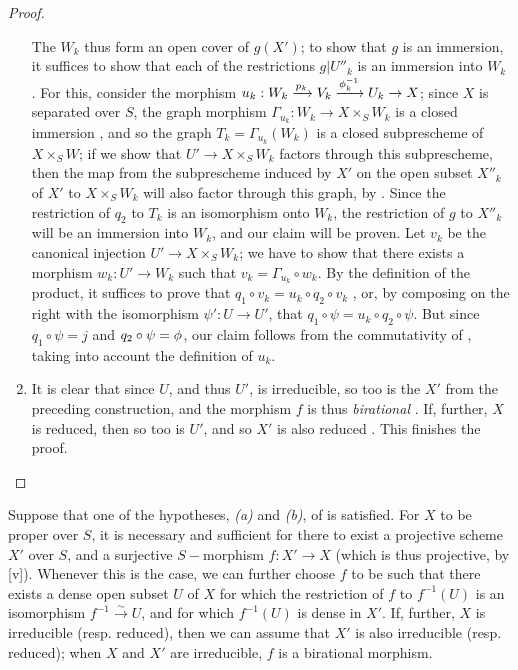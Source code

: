 \begin{proof}
\begin{enumerate}[label=(\Alph*)]
        The $W_k$ thus form an open cover of $g(X')$;
        to show that $g$ is an immersion, it suffices to show that each of the restrictions $g|U''_k$ is an immersion into $W_k$ .
        For this, consider the morphism $u_k:W_k\xrightarrow{p_k}V_k\xrightarrow{\vphi_k^{-1}}U_k\to X$;
        since $X$ is separated over $S$, the graph morphism $\Gamma_{u_k}:W_k\to X\times_S W_k$ is a closed immersion , and so the graph $T_k=\Gamma_{u_k}(W_k)$ is a closed subprescheme of $X\times_S W$;
        if we show that $U'\to X\times_S W_k$ factors through this subprescheme, then the map from the subprescheme induced by $X'$ on the open subset $X''_k$ of $X'$ to $X\times_S W_k$ will also factor through this graph, by .
        Since the restriction of $q_2$ to $T_k$ is an isomorphism onto $W_k$, the restriction of $g$ to $X''_k$ will be an immersion into $W_k$, and our claim will be proven.
        Let $v_k$ be the canonical injection $U'\to X\times_S W_k$;
        we have to show that there exists a morphism $w_k:U'\to W_k$ such that $v_k=\Gamma_{u_k}\circ w_k$.
        By the definition of the product, it suffices to prove that $q_1\circ v_k=u_k\circ q_2\circ v_k$ , or, by composing on the right
        with the isomorphism $\psi':U\to U'$, that $q_1\circ\psi=u_k\circ q_2\circ\psi$.
        But since $q_1\circ\psi=j$ and $q_2\circ\psi=\phi$, our claim follows from the commutativity of , taking into account the definition of $u_k$.
    \item It is clear that since $U$, and thus $U'$, is irreducible, so too is the $X'$ from the preceding construction, and the morphism $f$ is thus \emph{birational} .
        If, further, $X$ is reduced, then so too is $U'$, and so $X'$ is also reduced .
        This finishes the proof.
\end{enumerate}
\end{proof}

\begin{cor}[5.6.2]
\label{2.5.6.2}
Suppose that one of the hypotheses, \emph{(a)} and \emph{(b)}, of  is satisfied.
For $X$ to be proper over $S$, it is necessary and sufficient for there to exist a projective scheme $X'$ over $S$, and a surjective $S-$morphism $f:X'\to X$ (which is thus projective, by [v]).
Whenever this is the case, we can further choose $f$ to be such that there exists a dense open subset $U$ of $X$ for which the restriction of $f$ to $f^{-1}(U)$ is an isomorphism $f^{-1}\xrightarrow{\sim}U$, and for which $f^{-1}(U)$ is dense in $X'$.
If, further, $X$ is irreducible (resp. reduced), then we can assume that $X'$ is also irreducible (resp. reduced);
when $X$ and $X'$ are irreducible, $f$ is a birational morphism.
\end{cor}

